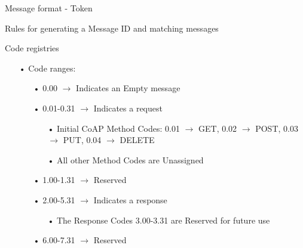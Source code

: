\documentclass[11pt]{beamer}
\begin{document}
\begin{frame}{Message format - Token}

\end{frame}
\begin{frame}{Rules for generating a Message ID and matching messages}

\end{frame}
\begin{frame}{Code registries}
\begin{itemize}
\item[•] Code ranges:
\begin{itemize}
\item[•] 0.00 $\rightarrow$ Indicates an Empty message
\item[•] 0.01-0.31 $\rightarrow$ Indicates a request
\begin{itemize}
\item[•] Initial CoAP Method Codes: 0.01 $\rightarrow$ GET, 0.02 $\rightarrow$ POST, 0.03 $\rightarrow$ PUT, 0.04 $\rightarrow$ DELETE
\item[•] All other Method Codes are Unassigned
\end{itemize}
\item[•] 1.00-1.31 $\rightarrow$ Reserved
\item[•] 2.00-5.31 $\rightarrow$ Indicates a response
\begin{itemize}
\item[•] The Response Codes 3.00-3.31 are Reserved for future use
\end{itemize}
\item[•] 6.00-7.31 $\rightarrow$ Reserved
\end{itemize}
\end{itemize}
\end{frame}
\end{document}
